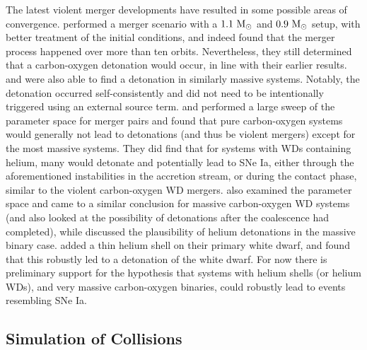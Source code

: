 \documentclass[12pt]{article}
\begin{document}
The latest violent merger developments have resulted in some possible areas of convergence.
\cite{pakmor:2012} performed a merger scenario
with a $1.1\ \mathrm{M}_\odot$ and $0.9\ \mathrm{M}_\odot$ setup, with better treatment
of the initial conditions, and indeed found that the merger process
happened over more than ten orbits. Nevertheless, they still determined
that a carbon-oxygen detonation would occur, in line with their
earlier results. \cite{moll:2014} and \cite{kashyap:2015} were also
able to find a detonation in similarly massive systems. Notably,
the detonation occurred self-consistently and did not need to be
intentionally triggered using an external source term.
\cite{dan:2012} and \cite{dan:2014} performed a large sweep
of the parameter space for merger pairs and
found that pure carbon-oxygen systems would generally not lead to
detonations (and thus be violent mergers) except for the most massive
systems. They did find that for systems with WDs containing helium, many
would detonate and potentially lead to SNe Ia, either through the
aforementioned instabilities in the accretion stream, or during the
contact phase, similar to the violent carbon-oxygen WD
mergers. \cite{sato:2015} also examined the parameter space and
came to a similar conclusion for massive carbon-oxygen WD systems
(and also looked at the possibility of detonations after the
coalescence had completed), while \cite{tanikawa:2015} discussed
the plausibility of helium detonations in the massive binary case.
\cite{pakmor:2013} added a thin helium shell on their primary
white dwarf, and found that this robustly led to a detonation of the
white dwarf. For now there is preliminary support for the hypothesis
that systems with helium shells (or helium WDs), and very massive carbon-oxygen binaries,
could robustly lead to events resembling SNe Ia.

\subsection{Simulation of Collisions}
\label{sec:collision_simulations}
\end{document}
